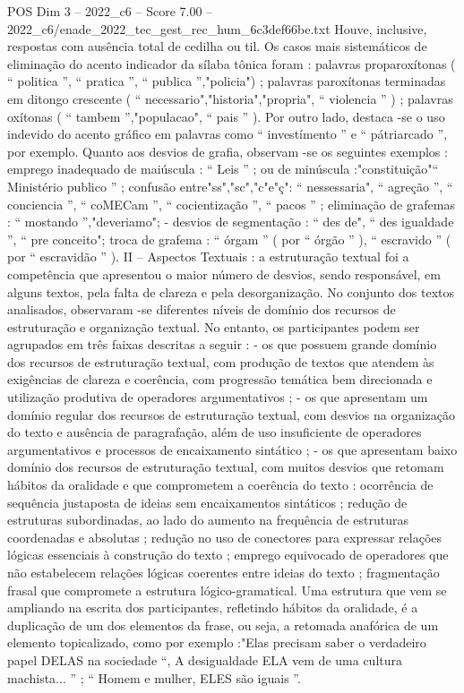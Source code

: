 \begin{textsample}{POS Dim 3 – 2022\_c6 – Score 7.00 – 2022\_c6/enade\_2022\_tec\_gest\_rec\_hum\_6c3def66be.txt}
Houve, inclusive, respostas com ausência total de cedilha ou til.
Os casos mais sistemáticos de eliminação do acento indicador da sílaba tônica foram : palavras proparoxítonas ( “ politica ”, “ pratica ”, “ publica ”,"policia") ; palavras paroxítonas terminadas em ditongo crescente ( “ necessario","historia","propria", “ violencia ” ) ; palavras oxítonas ( “ tambem ”,"populacao", “ pais ” ).
Por outro lado, destaca -se o uso indevido do acento gráfico em palavras como “ investímento ” e “ pátriarcado ”, por exemplo.
Quanto aos desvios de grafia, observam -se os seguintes exemplos : emprego inadequado de maiúscula : “ Leis ” ; ou de minúscula :"constituição"“ Ministério publico ” ; confusão entre"ss","sc","c"e"ç": “ nessessaria", “ agreção ”, “ conciencia ”, “ coMECam ”, “ cocientização ”, “ pacos ” ; eliminação de grafemas : “ mostando ”,"deveriamo"; - desvios de segmentação : “ des de", “ des igualdade ”, “ pre conceito"; troca de grafema : “ órgam ” ( por “ órgão ” ), “ escravido ” ( por “ escravidão ” ).
II – Aspectos Textuais : a estruturação textual foi a competência que apresentou o maior número de desvios, sendo responsável, em alguns textos, pela falta de clareza e pela desorganização.
No conjunto dos textos analisados, observaram -se diferentes níveis de domínio dos recursos de estruturação e organização textual.
No entanto, os participantes podem ser agrupados em três faixas descritas a seguir : - os que possuem grande domínio dos recursos de estruturação textual, com produção de textos que atendem às exigências de clareza e coerência, com progressão temática bem direcionada e utilização produtiva de operadores argumentativos ; - os que apresentam um domínio regular dos recursos de estruturação textual, com desvios na organização do texto e ausência de paragrafação, além de uso insuficiente de operadores argumentativos e processos de encaixamento sintático ; - os que apresentam baixo domínio dos recursos de estruturação textual, com muitos desvios que retomam hábitos da oralidade e que comprometem a coerência do texto : ocorrência de sequência justaposta de ideias sem encaixamentos sintáticos ; redução de estruturas subordinadas, ao lado do aumento na frequência de estruturas coordenadas e absolutas ; redução no uso de conectores para expressar relações lógicas essenciais à construção do texto ; emprego equivocado de operadores que não estabelecem relações lógicas coerentes entre ideias do texto ; fragmentação frasal que compromete a estrutura lógico-gramatical.
Uma estrutura que vem se ampliando na escrita dos participantes, refletindo hábitos da oralidade, é a duplicação de um dos elementos da frase, ou seja, a retomada anafórica de um elemento topicalizado, como por exemplo :"Elas precisam saber o verdadeiro papel DELAS na sociedade “, A desigualdade ELA vem de uma cultura machista... ” ; “ Homem e mulher, ELES são iguais ”.

\end{textsample}
